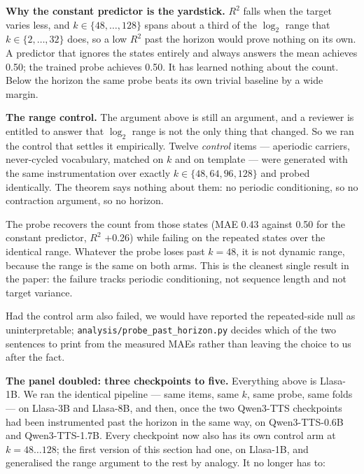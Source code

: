 \documentclass[11pt]{article}
\begin{document}
\noindent\textbf{Why the constant predictor is the yardstick.} $R^2$ falls when
the target varies less, and $k\in\{48,\ldots,128\}$ spans about a third of the
$\log_2$ range that $k\in\{2,\ldots,32\}$ does, so a low $R^2$ past the horizon
would prove nothing on its own. A predictor that ignores the states entirely and
always answers the mean achieves 0.50; the trained probe achieves 0.50. It
has learned nothing about the count. Below the horizon the same probe beats its
own trivial baseline by a wide margin.

\noindent\textbf{The range control.} The argument above is still an argument,
and a reviewer is entitled to answer that $\log_2$ range is not the only thing
that changed. So we ran the control that settles it empirically. Twelve
\emph{control} items --- aperiodic carriers, never-cycled vocabulary, matched on
$k$ and on template --- were generated with the same instrumentation over exactly
$k\in\{48,64,96,128\}$ and probed identically. The theorem says nothing about
them: no periodic conditioning, so no contraction argument, so no horizon.

The probe recovers the count from those states (MAE 0.43 against 0.50 for the
constant predictor, $R^2$ +0.26) while failing on the repeated states over the
identical range. Whatever the probe loses past $k=48$, it is not dynamic range,
because the range is the same on both arms. This is the cleanest single result in
the paper: the failure tracks periodic conditioning, not sequence length and not
target variance.

Had the control arm also failed, we would have reported the repeated-side null as
uninterpretable; \texttt{analysis/probe\_past\_horizon.py} decides which of the
two sentences to print from the measured MAEs rather than leaving the choice to
us after the fact.

\noindent\textbf{The panel doubled: three checkpoints to five.} Everything above
is Llasa-1B. We ran the identical pipeline --- same items, same $k$, same probe,
same folds --- on Llasa-3B and Llasa-8B, and then, once the two Qwen3-TTS
checkpoints had been instrumented past the horizon in the same way, on
Qwen3-TTS-0.6B and Qwen3-TTS-1.7B. Every checkpoint now also has its own control
arm at $k=48\ldots128$; the first version of this section had one, on Llasa-1B,
and generalised the range argument to the rest by analogy. It no longer has to:
\end{document}
